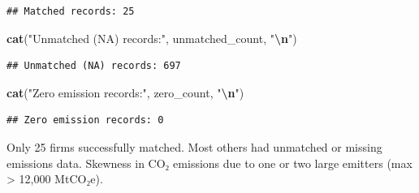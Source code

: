 \documentclass[
]{article}
\newenvironment{Shaded}{\begin{snugshade}}{\end{snugshade}}
\newcommand{\AttributeTok}[1]{\textcolor[rgb]{0.13,0.29,0.53}{#1}}
\newcommand{\ConstantTok}[1]{\textcolor[rgb]{0.56,0.35,0.01}{#1}}
\newcommand{\DecValTok}[1]{\textcolor[rgb]{0.00,0.00,0.81}{#1}}
\newcommand{\FunctionTok}[1]{\textcolor[rgb]{0.13,0.29,0.53}{\textbf{#1}}}
\newcommand{\NormalTok}[1]{#1}
\newcommand{\OtherTok}[1]{\textcolor[rgb]{0.56,0.35,0.01}{#1}}
\newcommand{\SpecialCharTok}[1]{\textcolor[rgb]{0.81,0.36,0.00}{\textbf{#1}}}
\newcommand{\StringTok}[1]{\textcolor[rgb]{0.31,0.60,0.02}{#1}}
\begin{document}
\begin{Shaded}
\end{Shaded}

\begin{verbatim}
## Matched records: 25
\end{verbatim}

\begin{Shaded}
\begin{Highlighting}[]
\FunctionTok{cat}\NormalTok{(}\StringTok{"Unmatched (NA) records:"}\NormalTok{, unmatched\_count, }\StringTok{"}\SpecialCharTok{\textbackslash{}n}\StringTok{"}\NormalTok{)}
\end{Highlighting}
\end{Shaded}

\begin{verbatim}
## Unmatched (NA) records: 697
\end{verbatim}

\begin{Shaded}
\begin{Highlighting}[]
\FunctionTok{cat}\NormalTok{(}\StringTok{"Zero emission records:"}\NormalTok{, zero\_count, }\StringTok{"}\SpecialCharTok{\textbackslash{}n}\StringTok{"}\NormalTok{)}
\end{Highlighting}
\end{Shaded}

\begin{verbatim}
## Zero emission records: 0
\end{verbatim}

Only 25 firms successfully matched. Most others had unmatched or missing
emissions data. Skewness in CO₂ emissions due to one or two large
emitters (max \textgreater{} 12,000 MtCO₂e).
\end{document}
